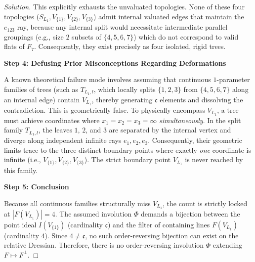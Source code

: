 \begin{proof}[Solution]
This explicitly exhausts the unvaluated topologies. None of these four topologies ($S_{L_1}, V_{\{1\}}, V_{\{2\}}, V_{\{3\}}$) admit internal valuated edges that maintain the $e_{123}$ ray, because any internal split would necessitate intermediate parallel groupings (e.g., size $2$ subsets of $\{4,5,6,7\}$) which do not correspond to valid flats of $F_7$. Consequently, they exist precisely as four isolated, rigid trees.

\medskip
\noindent \textbf{Step 4: Defusing Prior Misconceptions Regarding Deformations}

A known theoretical failure mode involves assuming that continuous $1$-parameter families of trees (such as $T_{L_1, l}$, which locally splits $\{1,2,3\}$ from $\{4,5,6,7\}$ along an internal edge) contain $V_{L_1}$, thereby generating $\mathfrak{c}$ elements and dissolving the contradiction. This is geometrically false. To physically encompass $V_{L_1}$, a tree must achieve coordinates where $x_1=x_2=x_3=\infty$ \emph{simultaneously}. In the split family $T_{L_1, l}$, the leaves $1$, $2$, and $3$ are separated by the internal vertex and diverge along independent infinite rays $e_1, e_2, e_3$. Consequently, their geometric limits trace to the three distinct boundary points where exactly \emph{one} coordinate is infinite (i.e., $V_{\{1\}}, V_{\{2\}}, V_{\{3\}}$). The strict boundary point $V_{L_1}$ is never reached by this family.

\medskip
\noindent \textbf{Step 5: Conclusion}

Because all continuous families structurally miss $V_{L_1}$, the count is strictly locked at $|F(V_{L_1})| = 4$. The assumed involution $\Phi$ demands a bijection between the point ideal $I(V_{\{1\}})$ (cardinality $\mathfrak{c}$) and the filter of containing lines $F(V_{L_1})$ (cardinality $4$). Since $4 \neq \mathfrak{c}$, no such order-reversing bijection can exist on the relative Dressian. 
Therefore, there is no order-reversing involution $\Phi$ extending $F \mapsto F^\perp$.
\end{proof}